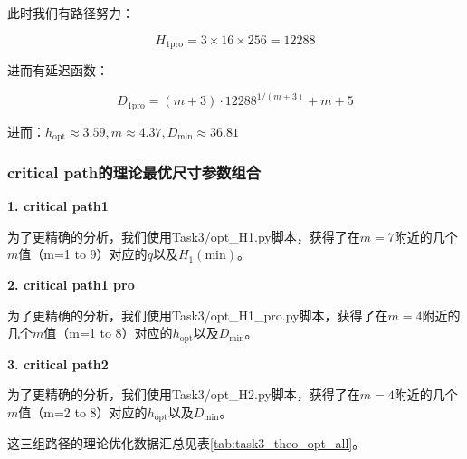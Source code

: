 \documentclass[UTF8,12pt,a4paper]{ctexart}
\begin{document}
此时我们有路径努力：

$$H_{\text{1pro}} = 3 \times 16 \times 256 = 12288$$

进而有延迟函数：

$$D_{\text{1pro}} = (m+3) \cdot 12288^{1/(m+3)} + m + 5$$

进而：$h_{\text{opt}} \approx 3.59, m \approx 4.37, D_{\text{min}} \approx 36.81$


\subsubsection{critical path的理论最优尺寸参数组合}

\textbf{1. critical path1}

为了更精确的分析，我们使用Task3/opt\_H1.py脚本，获得了在$m=7$附近的几个$m$值（m=1 to 9）对应的$q$以及$H_1(\text{min})$。

\textbf{2. critical path1 pro}

为了更精确的分析，我们使用Task3/opt\_H1\_pro.py脚本，获得了在$m=4$附近的几个$m$值（m=1 to 8）对应的$h_{\text{opt}}$以及$D_{\text{min}}$。

\textbf{3. critical path2}

为了更精确的分析，我们使用Task3/opt\_H2.py脚本，获得了在$m=4$附近的几个$m$值（m=2 to 8）对应的$h_{\text{opt}}$以及$D_{\text{min}}$。

这三组路径的理论优化数据汇总见表\ref{tab:task3_theo_opt_all}。
\end{document}
